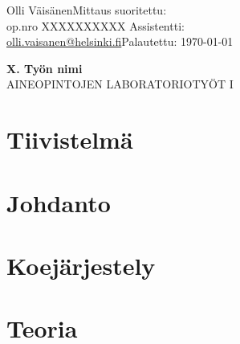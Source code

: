 \documentclass[a4paper, twoside, 12pt]{artikel3} %
\makeatletter
\newcommand{\email}{\href{mailto:olli.vaisanen@helsinki.fi}{olli.vaisanen@helsinki.fi}} %
\makeatother
\begin{document}
\dmyyyydate %

%

\thispagestyle{empty} 
Olli Väisänen\hfill Mittaus suoritettu:  \\%
op.nro XXXXXXXXXX \hfill Assistentti:  \\%
\email \hfill Palautettu: \today \\%
\vfill
\begin{center}
\textbf{\LARGE X. Työn nimi}\\ %
AINEOPINTOJEN LABORATORIOTYÖT I %
\end{center}
\vfill

\clearpage

\pagestyle{plain}

\section*{Tiivistelmä} 
	
\section{Johdanto}
	
\section{Koejärjestely}
	
\section{Teoria}
	
\end{document}
